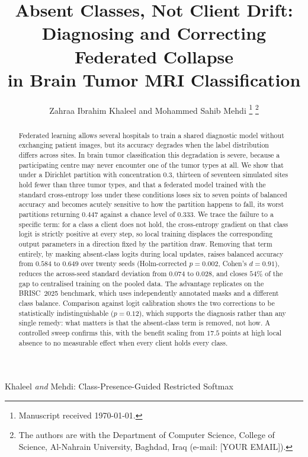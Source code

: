 \documentclass[journal]{IEEEtran}
\begin{document}
\title{Absent Classes, Not Client Drift:\\
Diagnosing and Correcting Federated Collapse\\
in Brain Tumor MRI Classification}

\author{Zahraa Ibrahim Khaleel and Mohammed Sahib Mehdi%
\thanks{Manuscript received \today.}
\thanks{The authors are with the Department of Computer Science, College of Science, Al-Nahrain University, Baghdad, Iraq (e-mail: [YOUR EMAIL]).}}

%
{Khaleel \MakeLowercase{\textit{and}} Mehdi: Class-Presence-Guided Restricted Softmax}

\maketitle

\begin{abstract}
Federated learning allows several hospitals to train a shared diagnostic model
without exchanging patient images, but its accuracy degrades when the label
distribution differs across sites. In brain tumor classification this
degradation is severe, because a participating centre may never encounter one
of the tumor types at all. We show that under a Dirichlet partition with
concentration $0.3$, thirteen of seventeen simulated sites hold fewer than
three tumor types, and that a federated model trained with the standard
cross-entropy loss under these conditions loses six to seven points of balanced
accuracy and becomes acutely sensitive to how the partition happens to fall, its
worst partitions returning $0.447$ against a chance level of $0.333$. We trace the failure to a specific
term: for a class a client does not hold, the cross-entropy gradient on that
class logit is strictly positive at every step, so local training displaces the
corresponding output parameters in a direction fixed by the partition draw.
Removing that term entirely, by masking absent-class logits during local
updates, raises balanced accuracy from $0.584$ to $0.649$ over twenty seeds
(Holm-corrected $p=0.002$, Cohen's $d=0.91$), reduces the across-seed standard
deviation from $0.074$ to $0.028$, and closes $54\%$ of the gap to centralised
training on the pooled data. The advantage replicates on the BRISC~2025
benchmark, which uses independently annotated masks and a different class
balance. Comparison against logit calibration shows the two corrections to be
statistically indistinguishable ($p=0.12$), which supports the diagnosis rather
than any single remedy: what matters is that the absent-class term is removed,
not how. A controlled sweep confirms this, with the benefit scaling from $17.5$
points at high local absence to no measurable effect when every client holds
every class.
\end{abstract}
\end{document}
